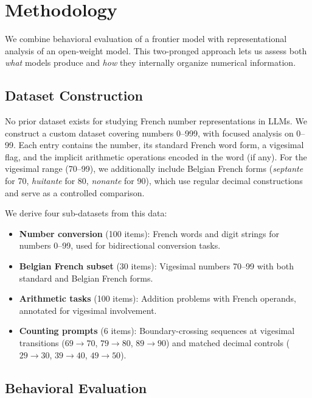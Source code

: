 \section{Methodology}
\label{sec:method}

We combine behavioral evaluation of a frontier model with representational analysis of an open-weight model.
This two-pronged approach lets us assess both \emph{what} models produce and \emph{how} they internally organize numerical information.

\subsection{Dataset Construction}
\label{sec:data}

No prior dataset exists for studying French number representations in LLMs.
We construct a custom dataset covering numbers 0--999, with focused analysis on 0--99.
Each entry contains the number, its standard French word form, a vigesimal flag, and the implicit arithmetic operations encoded in the word (if any).
For the vigesimal range (70--99), we additionally include Belgian French forms (\eg \emph{septante} for 70, \emph{huitante} for 80, \emph{nonante} for 90), which use regular decimal constructions and serve as a controlled comparison.

We derive four sub-datasets from this data:
\begin{itemize}[leftmargin=*,itemsep=0pt,topsep=0pt]
    \item \textbf{Number conversion} (100 items): French words and digit strings for numbers 0--99, used for bidirectional conversion tasks.
    \item \textbf{Belgian French subset} (30 items): Vigesimal numbers 70--99 with both standard and Belgian French forms.
    \item \textbf{Arithmetic tasks} (100 items): Addition problems with French operands, annotated for vigesimal involvement.
    \item \textbf{Counting prompts} (6 items): Boundary-crossing sequences at vigesimal transitions ($69 \to 70$, $79 \to 80$, $89 \to 90$) and matched decimal controls ($29 \to 30$, $39 \to 40$, $49 \to 50$).
\end{itemize}

\subsection{Behavioral Evaluation}
\label{sec:behavioral}

